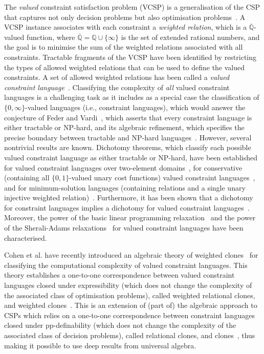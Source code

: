 \documentclass[11pt, reqno]{article}
\newcommand{\qq}{\ensuremath{\overline{\mathbb{Q}}}}
\theoremstyle{remark}
\begin{document}
The \emph{valued} constraint satisfaction problem (VCSP) is a generalisation of
the CSP that captures not only decision problems but also optimisation
problems~\cite{Cohen06:complexitysoft,z12:complexity,jkz14:beatcs}. A VCSP
instance associates with each constraint a \emph{weighted relation}, which is a
$\qq$-valued function, where $\qq=\mathbb{Q}\cup\{\infty\}$ is the set of
extended rational numbers, and the goal is to minimise the sum of the weighted
relations associated with all constraints. Tractable fragments of the VCSP have
been identified by restricting the types of allowed weighted relations that can
be used to define the valued constraints. A set of allowed weighted relations
has been called a \emph{valued constraint
language}~\cite{Cohen06:complexitysoft}. Classifying the complexity of
\emph{all} valued constraint languages is a challenging task as it includes as a
special case the classification of $\{0,\infty\}$-valued languages (i.e.,
constraint languages), which would answer the conjecture of Feder and
Vardi~\cite{Feder98:monotone}, which asserts that every constraint language is
either tractable or NP-hard, and its algebraic refinement, which specifies the
precise boundary between tractable and NP-hard
languages~\cite{Bulatov05:classifying}. However, several nontrivial results are
known. Dichotomy theorems, which classify each possible valued constraint
language as either tractable or NP-hard, have been established for valued
constraint languages over two-element domains~\cite{Cohen06:complexitysoft}, for
conservative (containing all $\{0,1\}$-valued unary cost functions) valued
constraint languages~\cite{kz13:jacm}, and for minimum-solution
languages (containing relations and a single unary injective weighted relation)~\cite{tz15:icalp}. Furthermore, it has been shown that a dichotomy for
constraint languages implies a dichotomy for valued constraint
languages~\cite{Kolmogorov15:general-valued}. Moreover, the power of the basic
linear programming relaxation~\cite{tz12:focs,kolmogorov13:icalp,ktz15:sicomp}
and the power of the Sherali-Adams relaxations~\cite{tz15:icalp} for valued
constraint languages have been characterised.

Cohen et al. have recently introduced an algebraic theory of weighted
clones~\cite{cccjz13:sicomp} for classifying the computational complexity of
valued constraint languages. This
theory establishes a one-to-one correspondence between valued constraint
languages closed under expressibility (which does not change the complexity of
the associated class of optimisation problems), called weighted relational
clones, and weighted clones~\cite{cccjz13:sicomp}.
This is an extension of (part of) the algebraic approach to CSPs which relies on a
one-to-one correspondence between constraint languages closed under
pp-definability (which does not change the
complexity of the associated class of decision problems), called
relational clones, and clones~\cite{Bulatov05:classifying}, thus making it possible
to use deep results from universal algebra.
\end{document}
